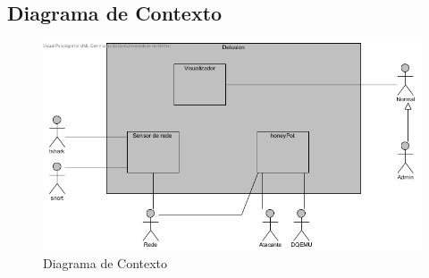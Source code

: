 \subsection{Diagrama de Contexto}

	\begin{figure}[!htb]
		\centering
		\includegraphics[scale=0.8]{images/DiagramaContexto}
		\caption{Diagrama de Contexto}
	\end{figure}


\pagebreak
